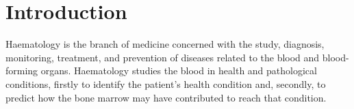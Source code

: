 \documentclass[sensors,review,submit,moreauthors,pdftex,10pt,a4paper]{mdpi}
\begin{document}
	
	
	\section{Introduction}
	
	Haematology is the branch of medicine concerned with the study, diagnosis, monitoring, treatment, and prevention of diseases related to the blood and blood-forming organs. Haematology studies the blood in health and pathological conditions, firstly to identify the patient's health condition and, secondly, to predict how the bone marrow may have contributed to reach that condition.
	
\end{document}
